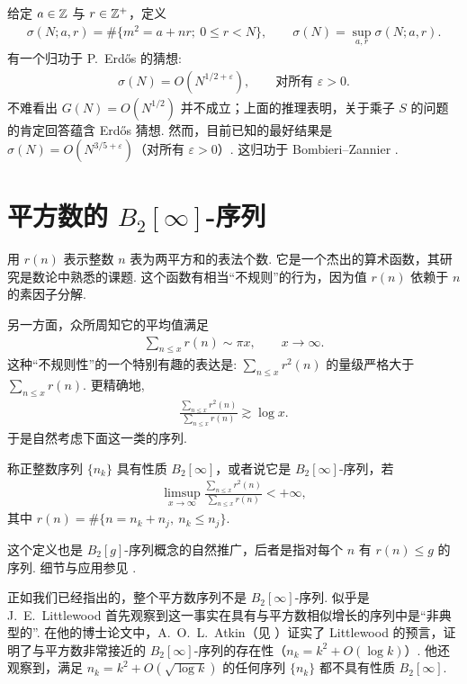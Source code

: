 给定 $a \in \mathbb{Z}$ 与 $r \in \mathbb{Z}^+$，定义
\begin{align*}
  \sigma(N;a,r)=\#\{m^{2}=a+nr;\ 0\leq r<N\},\qquad
  \sigma(N)=\sup_{a,r}\sigma(N;a,r).
\end{align*}
有一个归功于 P.~Erdős 的猜想:
\begin{align*}
  \sigma(N)=O(N^{1/2+\varepsilon}),\qquad \text{对所有 } \varepsilon>0.
\end{align*}
不难看出 $G(N) = O(N^{1/2})$ 并不成立；上面的推理表明，关于乘子 $S$ 的问题的肯定回答蕴含 Erdős 猜想. 然而，目前已知的最好结果是 $\sigma(N) = O(N^{3/5+\varepsilon})$（对所有 $\varepsilon > 0$）. 这归功于 Bombieri--Zannier \cite{b174}.

\section{平方数的 $B_{2}[\infty]$-序列}

用 $r(n)$ 表示整数 $n$ 表为两平方和的表法个数. 它是一个杰出的算术函数，其研究是数论中熟悉的课题. 这个函数有相当``不规则''的行为，因为值 $r(n)$ 依赖于 $n$ 的素因子分解.

另一方面，众所周知它的平均值满足
\begin{align*}
  \sum_{n\leq x}r(n)\sim\pi x,\qquad x\to\infty.
\end{align*}
这种``不规则性''的一个特别有趣的表达是: $\sum_{n \leq x} r^2(n)$ 的量级严格大于 $\sum_{n \leq x} r(n)$. 更精确地,
\begin{align*}
  \frac{\sum_{n\leq x}r^{2}(n)}{\sum_{n\leq x}r(n)}\gtrsim\log x.
\end{align*}
于是自然考虑下面这一类的序列.

\begin{definition}\label{def:8.3}
称正整数序列 $\{n_k\}$ 具有性质 $B_2[\infty]$，或者说它是 $B_2[\infty]$-序列，若
\begin{align*}
  \limsup_{x\to\infty}\frac{\sum_{n\leq x}r^{2}(n)}{\sum_{n\leq x}r(n)}<+\infty,
\end{align*}
其中 $r(n) = \#\{n = n_k + n_j,\ n_k \leq n_j\}$.
\end{definition}

这个定义也是 $B_2[g]$-序列概念的自然推广，后者是指对每个 $n$ 有 $r(n) \leq g$ 的序列. 细节与应用参见 \cite{b189}.

正如我们已经指出的，整个平方数序列不是 $B_2[\infty]$-序列. 似乎是 J.~E.~Littlewood 首先观察到这一事实在具有与平方数相似增长的序列中是``非典型的''. 在他的博士论文中，A.~O.~L.~Atkin（见 \cite{b171}）证实了 Littlewood 的预言，证明了与平方数非常接近的 $B_2[\infty]$-序列的存在性（$n_k = k^2 + O(\log k)$）. 他还观察到，满足 $n_k = k^2 + O(\sqrt{\log k})$ 的任何序列 $\{n_k\}$ 都不具有性质 $B_2[\infty]$.

